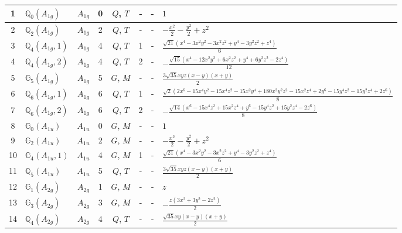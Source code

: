 \documentclass[fleqn,10pt,landscape]{jsarticle}
\begin{document}
\begin{longtable}[l]{clcccccl}
1 & $\mathbb{Q}_{0}(A_{1g})$ & $A_{1g}$ & 0 & $Q$, $T$ & - & - & $1$ \\ \hline
2 & $\mathbb{Q}_{2}(A_{1g})$ & $A_{1g}$ & 2 & $Q$, $T$ & - & - & $- \frac{x^{2}}{2} - \frac{y^{2}}{2} + z^{2}$ \\ \hline
3 & $\mathbb{Q}_{4}(A_{1g},1)$ & $A_{1g}$ & 4 & $Q$, $T$ & 1 & - & $\frac{\sqrt{21} \left(x^{4} - 3 x^{2} y^{2} - 3 x^{2} z^{2} + y^{4} - 3 y^{2} z^{2} + z^{4}\right)}{6}$ \\ \hline
4 & $\mathbb{Q}_{4}(A_{1g},2)$ & $A_{1g}$ & 4 & $Q$, $T$ & 2 & - & $- \frac{\sqrt{15} \left(x^{4} - 12 x^{2} y^{2} + 6 x^{2} z^{2} + y^{4} + 6 y^{2} z^{2} - 2 z^{4}\right)}{12}$ \\ \hline
5 & $\mathbb{G}_{5}(A_{1g})$ & $A_{1g}$ & 5 & $G$, $M$ & - & - & $\frac{3 \sqrt{35} x y z \left(x - y\right) \left(x + y\right)}{2}$ \\ \hline
6 & $\mathbb{Q}_{6}(A_{1g},1)$ & $A_{1g}$ & 6 & $Q$, $T$ & 1 & - & $\frac{\sqrt{2} \left(2 x^{6} - 15 x^{4} y^{2} - 15 x^{4} z^{2} - 15 x^{2} y^{4} + 180 x^{2} y^{2} z^{2} - 15 x^{2} z^{4} + 2 y^{6} - 15 y^{4} z^{2} - 15 y^{2} z^{4} + 2 z^{6}\right)}{8}$ \\ \hline
7 & $\mathbb{Q}_{6}(A_{1g},2)$ & $A_{1g}$ & 6 & $Q$, $T$ & 2 & - & $- \frac{\sqrt{14} \left(x^{6} - 15 x^{4} z^{2} + 15 x^{2} z^{4} + y^{6} - 15 y^{4} z^{2} + 15 y^{2} z^{4} - 2 z^{6}\right)}{8}$ \\ \hline
8 & $\mathbb{G}_{0}(A_{1u})$ & $A_{1u}$ & 0 & $G$, $M$ & - & - & $1$ \\ \hline
9 & $\mathbb{G}_{2}(A_{1u})$ & $A_{1u}$ & 2 & $G$, $M$ & - & - & $- \frac{x^{2}}{2} - \frac{y^{2}}{2} + z^{2}$ \\ \hline
10 & $\mathbb{G}_{4}(A_{1u},1)$ & $A_{1u}$ & 4 & $G$, $M$ & 1 & - & $\frac{\sqrt{21} \left(x^{4} - 3 x^{2} y^{2} - 3 x^{2} z^{2} + y^{4} - 3 y^{2} z^{2} + z^{4}\right)}{6}$ \\ \hline
11 & $\mathbb{Q}_{5}(A_{1u})$ & $A_{1u}$ & 5 & $Q$, $T$ & - & - & $\frac{3 \sqrt{35} x y z \left(x - y\right) \left(x + y\right)}{2}$ \\ \hline
12 & $\mathbb{G}_{1}(A_{2g})$ & $A_{2g}$ & 1 & $G$, $M$ & - & - & $z$ \\ \hline
13 & $\mathbb{G}_{3}(A_{2g})$ & $A_{2g}$ & 3 & $G$, $M$ & - & - & $- \frac{z \left(3 x^{2} + 3 y^{2} - 2 z^{2}\right)}{2}$ \\ \hline
14 & $\mathbb{Q}_{4}(A_{2g})$ & $A_{2g}$ & 4 & $Q$, $T$ & - & - & $\frac{\sqrt{35} x y \left(x - y\right) \left(x + y\right)}{2}$ \\ \hline

\end{longtable}
\end{document}
